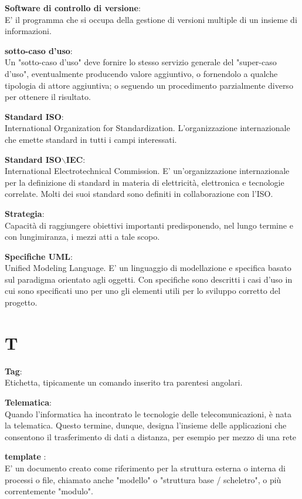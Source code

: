 \documentclass[a4paper, oneside, openany, dvipsnames, table]{article}
\begin{document}
\textbf{Software di controllo di versione}:\\ E' il programma che si occupa della  gestione di versioni multiple di un insieme di informazioni.

\textbf{sotto-caso d'uso}:\\
Un "sotto-caso d'uso" deve fornire lo stesso servizio generale del "super-caso d'uso", eventualmente producendo valore aggiuntivo, o fornendolo a qualche tipologia di attore aggiuntiva; o seguendo un procedimento parzialmente diverso per ottenere il risultato.

\textbf{Standard ISO}:\\	International Organization for Standardization. L'organizzazione internazionale che emette standard in tutti i campi interessati.

\textbf{Standard ISO$\backslash$IEC}:\\	International Electrotechnical Commission. E' un'organizzazione internazionale per la definizione di standard in materia di elettricità, elettronica e tecnologie correlate. Molti dei suoi standard sono definiti in collaborazione con l'ISO.

\textbf{Strategia}:\\	Capacità di raggiungere obiettivi importanti predisponendo, nel lungo termine e con lungimiranza, i mezzi atti a tale scopo.

\textbf{Specifiche UML}:\\	Unified Modeling Language. E' un linguaggio di modellazione e specifica basato sul paradigma orientato agli oggetti. Con specifiche  sono descritti i casi d'uso in cui sono specificati uno per uno gli elementi utili per lo sviluppo corretto del progetto.


\newpage
\section{T}
\textbf{Tag}:\\		Etichetta, tipicamente un comando inserito tra parentesi angolari.

\textbf{Telematica}:\\	 Quando l'informatica ha incontrato le tecnologie delle telecomunicazioni, è nata la telematica. Questo termine, dunque, designa l'insieme delle applicazioni che consentono il trasferimento di dati a distanza, per esempio per mezzo di una rete 

\textbf{template }:\\ E' un documento creato come riferimento per la struttura esterna o interna di processi o file, chiamato anche "modello" o "struttura base / scheletro", o più correntemente "modulo".
\end{document}
